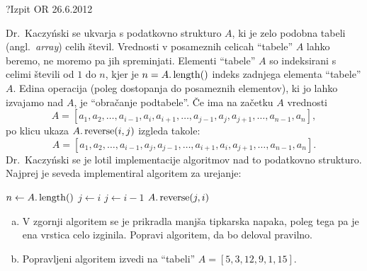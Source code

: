 \begin{naloga}{?}{Izpit OR 26.6.2012}
\begin{vprasanje}[reverse]
Dr.~Kaczyński se ukvarja s podatkovno strukturo $A$,
ki je zelo podobna tabeli (angl.~{\em array}) celih števil.
Vrednosti v posameznih celicah ``tabele'' $A$ lahko beremo,
ne moremo pa jih spreminjati.
Elementi ``tabele'' $A$ so indeksirani s celimi števili od $1$ do $n$,
kjer je $n = A.\operatorname{length}()$ indeks zadnjega elementa ``tabele'' $A$.
Edina operacija (poleg dostopanja do posameznih elementov),
ki jo lahko izvajamo nad $A$, je ``obračanje podtabele''.
Če ima na začetku $A$ vrednosti
$$
A = [a_1, a_2, \dots, a_{i-1}, a_i, a_{i+1}, \dots, a_{j-1}, a_j, a_{j+1},
     \dots, a_{n-1}, a_n],
$$
po klicu ukaza $A.\operatorname{reverse}(i, j)$ izgleda takole:
$$
A = [a_1, a_2, \dots, a_{i-1}, a_j, a_{j-1}, \dots, a_{i+1}, a_i, a_{j+1},
     \dots, a_{n-1}, a_n] .
$$
Dr.~Kaczyński se je lotil implementacije algoritmov
nad to podatkovno strukturo.
Najprej je seveda implementiral algoritem za urejanje:
\begin{small}
\begin{algorithmic}
\State $n \gets A.\operatorname{length}()$
    \State $j \gets i$
        \State $j \gets i-1$
    \EndWhile
    \State $A.\operatorname{reverse}(j, i)$
        \State
    \EndIf
\EndFor
\end{algorithmic}
\end{small}

\begin{enumerate}[(a)]
\item V zgornji algoritem se je prikradla manjša tipkarska napaka,
poleg tega pa je ena vrstica celo izginila.
Popravi algoritem, da bo deloval pravilno.

\item Popravljeni algoritem izvedi na ``tabeli'' $A = [5, 3, 12, 9, 1, 15]$.
\end{enumerate}
\end{vprasanje}
\begin{odgovor}
\end{odgovor}
\end{naloga}


